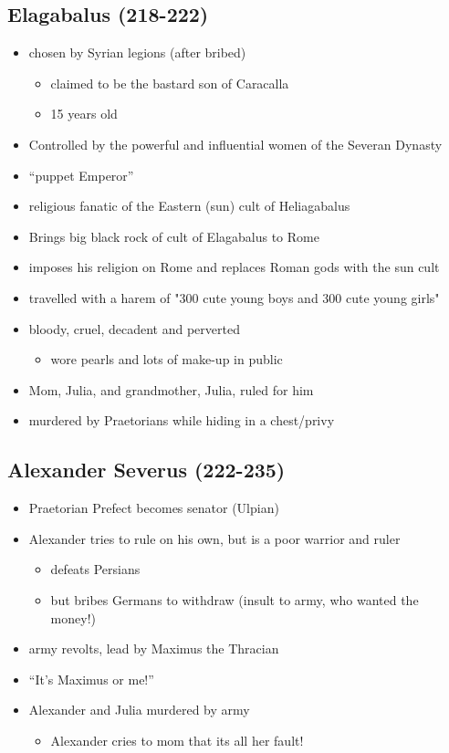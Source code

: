 \documentclass[12pt, twoside]{article}
\begin{document}
\subsection{Elagabalus (218-222)}
\begin{itemize}
\item chosen by Syrian legions (after bribed)	
	\begin{itemize}
	\item claimed to be the bastard son of Caracalla
	\item 15 years old
	\end{itemize}
\item Controlled by the powerful and influential women of the Severan Dynasty
\item “puppet Emperor”
\item religious fanatic of the Eastern (sun) cult of Heliagabalus
\item Brings big black rock of cult of Elagabalus to Rome
\item imposes his religion on Rome and replaces Roman gods with the sun cult
\item travelled with a harem of "300 cute young boys and 300 cute young girls"
\item bloody, cruel, decadent and perverted
	\begin{itemize}
	\item wore pearls and lots of make-up in public
	\end{itemize}
\item Mom, Julia, and grandmother, Julia, ruled for him
\item murdered by Praetorians while hiding in a chest/privy
\end{itemize}

\subsection{Alexander Severus (222-235)}
\begin{itemize}
\item Praetorian Prefect becomes senator (Ulpian)
\item Alexander tries to rule on his own, but is a poor warrior and ruler
	\begin{itemize}
	\item defeats Persians
	\item but bribes Germans to withdraw (insult to army, who wanted the money!)
	\end{itemize}
\item army revolts, lead by Maximus the Thracian
\item “It’s Maximus or me!”
\item Alexander and Julia murdered by army
	\begin{itemize}
	\item Alexander cries to mom that its all her fault!
	\end{itemize}
\end{itemize}
\end{document}
